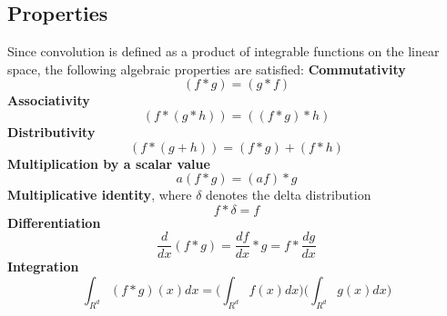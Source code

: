 \subsection{Properties}
\label{sec:convolution:mathematics:properties}
Since convolution is defined as a product of integrable functions on the linear space, the following algebraic properties are satisfied\cite{Bracewell2000}:\newline
\textbf{Commutativity}
\begin{equation}
(f * g)=(g * f)
\end{equation}
\textbf{Associativity}
\begin{equation}
(f * (g * h))=((f * g) * h)
\end{equation}
\textbf{Distributivity}
\begin{equation}
(f * (g + h))=(f * g) + (f * h)
\end{equation}
\textbf{Multiplication by a scalar value}
\begin{equation}
a (f * g) = (af) * g
\end{equation}
\textbf{Multiplicative identity}, where $\delta$ denotes the delta distribution 
\begin{equation}
f * \delta = f
\end{equation}
\textbf{Differentiation}
\begin{equation}
\frac{d}{dx}(f * g) = \frac{df}{dx} * g = f * \frac{dg}{dx}
\end{equation}
\textbf{Integration}
\begin{equation}
\int_{R^d} (f * g)(x)dx = \bigg(\int_{R^d} f(x)dx\bigg)\bigg(\int_{R^d} g(x)dx\bigg)
\end{equation}
